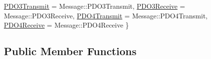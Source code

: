 \begin{DoxyCompactItemize}
\newline
\hyperlink{class_c_a_nopen_1_1_driver_af1538f81dbeb9dcafee3ff1a71c95be4ae5889c8e1d945aa150ba4213617681d5}{P\+D\+O3\+Transmit} = Message\+:\+:P\+D\+O3\+Transmit, 
\hyperlink{class_c_a_nopen_1_1_driver_af1538f81dbeb9dcafee3ff1a71c95be4ad6ff06a6427b5f68ecea8552f1a01ef9}{P\+D\+O3\+Receive} = Message\+:\+:P\+D\+O3\+Receive, 
\hyperlink{class_c_a_nopen_1_1_driver_af1538f81dbeb9dcafee3ff1a71c95be4ae5f1f938d9d8b8833be74c805268e9ca}{P\+D\+O4\+Transmit} = Message\+:\+:P\+D\+O4\+Transmit, 
\hyperlink{class_c_a_nopen_1_1_driver_af1538f81dbeb9dcafee3ff1a71c95be4a6e9b86ade5180f6dcca330b94d1fd4da}{P\+D\+O4\+Receive} = Message\+:\+:P\+D\+O4\+Receive
 \}
\end{DoxyCompactItemize}
\subsection*{Public Member Functions}
